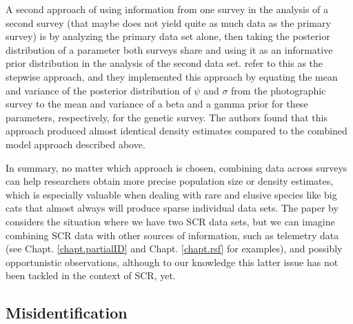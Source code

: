 A second approach of using information from one survey in the analysis
of a second survey (that maybe does not yield quite as much data as
the primary survey) is by analyzing the %
primary data set alone, then
taking the posterior distribution of a parameter both surveys share
and using it as an informative prior distribution in the analysis of
the second data set. \citet{gopalaswamy_etal:2012mee} refer to this as
the stepwise approach, and they implemented this approach by equating
the mean and variance of the posterior distribution of $\psi$ and
$\sigma$ from the photographic survey to the mean and variance of a
beta and a gamma prior for these parameters, respectively, for the
genetic survey. The authors found that this approach produced almost
identical density estimates compared to the combined model approach
described above.

In summary, no matter which approach is chosen, combining data across
surveys can help researchers %
obtain more precise population size or
density
estimates, which is especially valuable when dealing with rare and
elusive species like big cats that almost always will produce sparse
individual data sets.
The paper by \citet{gopalaswamy_etal:2012mee} considers the
situation where we have two SCR data sets, but we can imagine
combining SCR data with other sources of information, such as
telemetry data (see Chapt. \ref{chapt.partialID} and
Chapt. \ref{chapt.rsf} for examples), and possibly opportunistic
observations, although to our knowledge this latter issue has not been
tackled in the context of SCR, yet.


\subsection{Misidentification}

